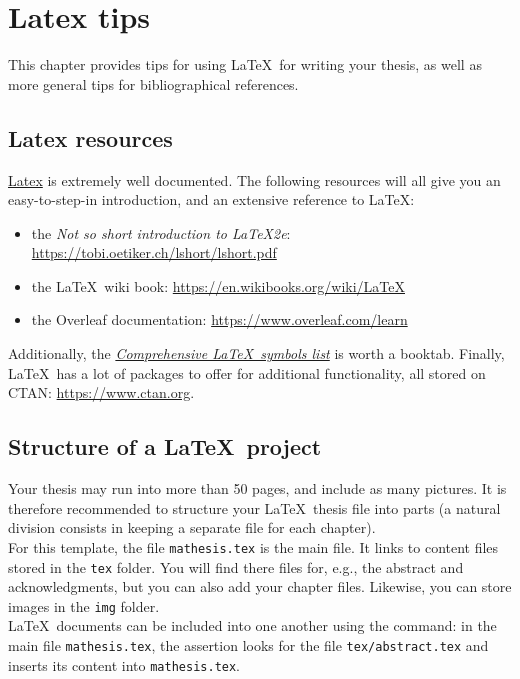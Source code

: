 
\chapter{Latex tips} \label{ch:tips}
This chapter provides tips for using \LaTeX\ for writing your thesis, as well as more general tips for bibliographical references.

\section{Latex resources}
\href{https://www.latex-project.org}{Latex} is extremely well documented. 
The following resources will all give you an easy-to-step-in introduction, and an extensive reference to \LaTeX:
\begin{itemize}
\item the {\em Not so short introduction to \LaTeX 2e}: \url{https://tobi.oetiker.ch/lshort/lshort.pdf}
\item the \LaTeX\ wiki book: \url{https://en.wikibooks.org/wiki/LaTeX}
\item the Overleaf documentation: \url{https://www.overleaf.com/learn}
\end{itemize} 

Additionally, the \href{http://tug.ctan.org/info/symbols/comprehensive/symbols-a4.pdf}{\em Comprehensive \LaTeX\ symbols list} is worth a booktab.
Finally, \LaTeX\ has a lot of packages to offer for additional functionality, all stored on CTAN: \url{https://www.ctan.org}.


\section{Structure of a \LaTeX\ project}
Your thesis may run into more than 50 pages, and include as many pictures. It is therefore recommended to structure your \LaTeX\ thesis file into parts (a natural division consists in keeping a separate file for each chapter). \\

For this template, the file \texttt{mathesis.tex} is the main file. It links to content files stored in the \texttt{tex} folder. You will find there files for, e.g., the abstract and acknowledgments, but you can also add your chapter files.
Likewise, you can store images in the \texttt{img} folder.\\


\LaTeX\ documents can be included into one another using the \verb|| command: in the main file \texttt{mathesis.tex}, the assertion \verb|| looks for the file \texttt{tex/abstract.tex} and inserts its content into \texttt{mathesis.tex}.

